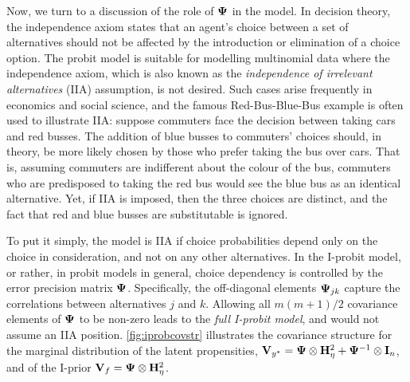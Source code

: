 \vspace{-0.1em}
Now, we turn to a discussion of the role of ${\bm\Psi}$ in the model.
In decision theory, the independence axiom states that an agent's choice between a set of alternatives should not be affected by the introduction or elimination of a choice option.
The probit model is suitable for modelling multinomial data where the independence axiom, which is also known as the \emph{independence of irrelevant alternatives} (IIA) assumption, is not desired. 
Such cases arise frequently in economics and social science, and the famous Red-Bus-Blue-Bus example is often used to illustrate IIA:
suppose commuters face the decision between taking cars and red busses. 
The addition of blue busses to commuters' choices should, in theory, be more likely chosen by those who prefer taking the bus over cars.
That is, assuming commuters are indifferent about the colour of the bus, commuters who are predisposed to taking the red bus would see the blue bus as an identical alternative.
 Yet, if IIA is imposed, then the three choices are distinct, and the fact that red and blue busses are substitutable is ignored.

To put it simply, the model is IIA if choice probabilities depend only on the choice in consideration, and not on any other alternatives.
In the I-probit model, or rather, in probit models in general, choice dependency is controlled by the error precision matrix ${\bm\Psi}$.
Specifically, the off-diagonal elements ${\bm\Psi}_{jk}$ capture the correlations between alternatives $j$ and $k$.
Allowing all $m(m+1)/2$ covariance elements of ${\bm\Psi}$ to be non-zero leads to the \emph{full I-probit model}, and would not assume an IIA position.
\cref{fig:iprobcovstr} illustrates the covariance structure for the marginal distribution of the latent propensities, ${\mathbf V}_{y^*} = {\bm\Psi} \otimes {\mathbf H}_\eta^2 + {\bm\Psi}^{-1} \otimes {\mathbf I}_n$, and of the I-prior ${\mathbf V}_f = {\bm\Psi} \otimes {\mathbf H}_\eta^2$.

